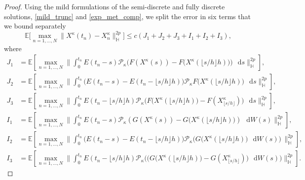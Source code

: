 \documentclass[a4paper]{amsart}
\theoremstyle{remark}
\theoremstyle{definition}
\newcommand{\HH}{\mathbb{H}}
\newcommand*\dd{\mathop{}\!\mathrm{d}}
\newcommand{\floor}[1]{\lfloor #1 \rfloor}
\begin{document}
\begin{proof}
Using the mild formulations of the semi-discrete and fully discrete solutions, \eqref{mild_trunc} and \eqref{exp_met_comp}, we split the error in six terms that we bound separately
$$
\mathbb{E}\bigg[\max_{n=1,\dots,N}\big\|X^\kappa(t_n)-X_{n}^\kappa \big\|^{2p}_{\HH}\bigg]\le c \left(J_1+J_2+J_3+I_1+I_2+I_3\right),
$$
where
$$
\begin{aligned}
   J_1 & =\mathbb{E}\left[\max_{n=1,\dots,N}\bigg\|
    \int_{0}^{t_n} E(t_n-s)
\mathcal{P}_\kappa\bigg( F(X^\kappa(s))- F\big(X^\kappa(\floor{s/h}h)\big)\bigg)\,\dd s\bigg\|^{2p}_{\HH}\right],\\
J_2 & =\mathbb{E}\left[\max_{n=1,\dots,N}\bigg\|
\int_{0}^{t_{n}}\big(E(t_n-s)-E(t_n-\floor{s/h}h)\big)\mathcal{P}_\kappa F\big(X^\kappa(\floor{s/h}h)\big)\,\dd s\bigg\|^{2p}_{\HH}\right],\\
J_3 & =\mathbb{E}\left[\max_{n=1,\dots,N}\bigg\|\int_{0}^{t_{n}}E(t_n-\floor{s/h}h)
\mathcal{P}_\kappa \big(F\big(X^\kappa(\floor{s/h}h)\big)-F(X^\kappa_{\floor{s/h}})\big)\,\dd s\bigg\|^{2p}_{\HH}\right],\\
I_1 & =\mathbb{E}\left[\max_{n=1,\dots,N}\bigg\|
    \int_{0}^{t_n} E(t_n-s)
\mathcal{P}_\kappa \left(G(X^\kappa(s))- G\big(X^\kappa(\floor{s/h}h))\right)\, \dd W(s)\bigg\|^{2p}_{\HH}\right],\\
I_2 & =\mathbb{E}\left[\max_{n=1,\dots,N}\bigg\|
\int_{0}^{t_{n}}\big(E(t_n-s)-E(t_n-\floor{s/h}h)\big)\mathcal{P}_\kappa \big(G\big(X^\kappa(\floor{s/h}h)\big)\,\dd W(s)\big)\,\bigg\|^{2p}_{\HH}\right],\\
I_3 & =\mathbb{E}\left[\max_{n=1,\dots,N}\bigg\|\int_{0}^{t_{n}}E(t_n-\floor{s/h}h)
\mathcal{P}_\kappa \big(\big(G\big(X^\kappa(\floor{s/h}h)\big)-G(X^\kappa_{\floor{s/h}})\big)\,\dd W(s)\big)\bigg\|^{2p}_{\HH}\right].
\end{aligned}
$$


\end{proof}
\end{document}
